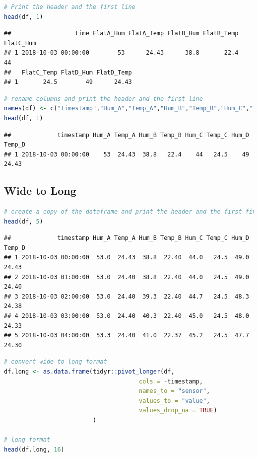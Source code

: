 \documentclass[
]{book}
\begin{document}
\begin{lstlisting}[language=R]
# Print the header and the first line
head(df, 1)
\end{lstlisting}

\begin{lstlisting}
##                  time FlatA_Hum FlatA_Temp FlatB_Hum FlatB_Temp FlatC_Hum
## 1 2018-10-03 00:00:00        53      24.43      38.8       22.4        44
##   FlatC_Temp FlatD_Hum FlatD_Temp
## 1       24.5        49      24.43
\end{lstlisting}

\begin{lstlisting}[language=R]
# rename columns and print the header and the first line
names(df) <- c("timestamp","Hum_A","Temp_A","Hum_B","Temp_B","Hum_C","Temp_C","Hum_D", "Temp_D")
head(df, 1)
\end{lstlisting}

\begin{lstlisting}
##             timestamp Hum_A Temp_A Hum_B Temp_B Hum_C Temp_C Hum_D Temp_D
## 1 2018-10-03 00:00:00    53  24.43  38.8   22.4    44   24.5    49  24.43
\end{lstlisting}

\hypertarget{wide-to-long}{%
\subsection{Wide to Long}\label{wide-to-long}}

\begin{lstlisting}[language=R]
# create a copy of the dataframe and print the header and the first five line
head(df, 5)
\end{lstlisting}

\begin{lstlisting}
##             timestamp Hum_A Temp_A Hum_B Temp_B Hum_C Temp_C Hum_D Temp_D
## 1 2018-10-03 00:00:00  53.0  24.43  38.8  22.40  44.0   24.5  49.0  24.43
## 2 2018-10-03 01:00:00  53.0  24.40  38.8  22.40  44.0   24.5  49.0  24.40
## 3 2018-10-03 02:00:00  53.0  24.40  39.3  22.40  44.7   24.5  48.3  24.38
## 4 2018-10-03 03:00:00  53.0  24.40  40.3  22.40  45.0   24.5  48.0  24.33
## 5 2018-10-03 04:00:00  53.3  24.40  41.0  22.37  45.2   24.5  47.7  24.30
\end{lstlisting}

\begin{lstlisting}[language=R]
# convert wide to long format
df.long <- as.data.frame(tidyr::pivot_longer(df,
                                      cols = -timestamp,
                                      names_to = "sensor",
                                      values_to = "value",
                                      values_drop_na = TRUE)
                         )

# long format
head(df.long, 16)
\end{lstlisting}
\end{document}
